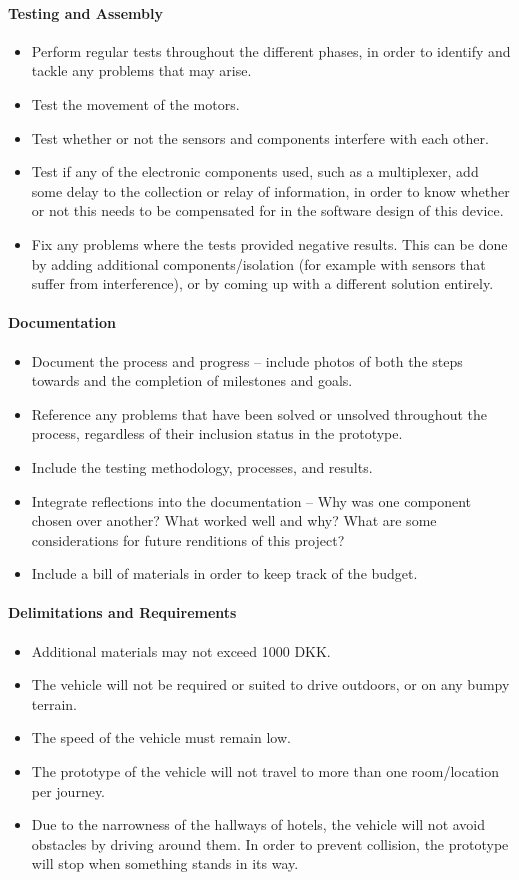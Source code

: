 \documentclass[11pt]{article}
\begin{document}
\paragraph{Testing and Assembly}
\begin{itemize}
\item{Perform regular tests throughout the different phases, in order to identify and tackle any problems that may arise.}
\item{Test the movement of the motors.}
\item{Test whether or not the sensors and components interfere with each other.}
\item{Test if any of the electronic components used, such as a multiplexer, add some delay to the collection or relay of information, in order to know whether or not this needs to be compensated for in the software design of this device.}
\item{Fix any problems where the tests provided negative results. This can be done by adding additional components/isolation (for example with sensors that suffer from interference), or by coming up with a different solution entirely.}
\end{itemize}
\paragraph{Documentation}
\begin{itemize}
\item{Document the process and progress – include photos of both the steps towards and the completion of milestones and goals.}
\item{Reference any problems that have been solved or unsolved throughout the process, regardless of their inclusion status in the prototype.}
\item{Include the testing methodology, processes, and results.}
\item{Integrate reflections into the documentation – Why was one component chosen over another? What worked well and why? What are some considerations for future renditions of this project?}
\item{Include a bill of materials in order to keep track of the budget.}
\end{itemize}
\paragraph{Delimitations and Requirements}
\begin{itemize}
\item{Additional materials may not exceed 1000 DKK.}
\item{The vehicle will not be required or suited to drive outdoors, or on any bumpy terrain.}
\item{The speed of the vehicle must remain low.}
\item{The prototype of the vehicle will not travel to more than one room/location per journey.}
\item{Due to the narrowness of the hallways of hotels, the vehicle will not avoid obstacles by driving around them. In order to prevent collision, the prototype will stop when something stands in its way.}
\end{itemize}
\end{document}
